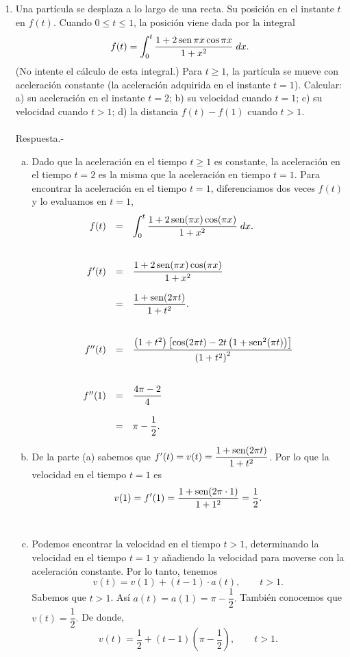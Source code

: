 \begin{enumerate}[\bfseries 1.]
    \item Una partícula se desplaza a lo largo de una recta. Su posición en el instante $t$ en $f(t)$. Cuando $0\leq t \leq 1$, la posición viene dada por la integral
    $$f(t)=\int_0^t \dfrac{1+2\mathop{\mbox{\normalfont sen}}\nolimits \pi x \cos \pi x}{1+x^2}\; dx.$$
    (No intente el cálculo de esta integral.) Para $t\geq 1$, la partícula se mueve con aceleración constante (la aceleración adquirida en el instante $t=1$). Calcular: a) su aceleración en el instante $t=2$; b) su velocidad cuando $t=1$; c) su velocidad cuando $t>1$; d) la distancia $f(t)-f(1)$ cuando $t>1$.\\\\
    	Respuesta.-\;
	\begin{enumerate}[a)]
	    \item Dado que la aceleración en el tiempo $t\geq 1$ es constante, la aceleración en el tiempo $t=2$ es la misma que la aceleración en tiempo $t=1$. Para encontrar la aceleración en el tiempo $t=1$, diferenciamos dos veces $f(t)$ y lo evaluamos en $t=1$,
	    $$\begin{array}{rcl}
		f(t)&=&\displaystyle\int_0^t \dfrac{1+2\mathop{\mbox{\normalfont sen}}\nolimits(\pi x)\cos (\pi x)}{1+x^2}\; dx.\\\\
		&&\\
		f'(t) &=& \dfrac{1+2\mathop{\mbox{\normalfont sen}}\nolimits(\pi x)\cos (\pi x)}{1+x^2}\\\\
		      &=& \dfrac{1+\mathop{\mbox{\normalfont sen}}\nolimits(2\pi t)}{1+t^2}.\\\\
		&&\\
		f''(t) &=& \dfrac{\left(1+t^2\right)\left[\cos(2\pi t)-2t\left(1+\mathop{\mbox{\normalfont sen}}\nolimits^2(\pi t)\right)\right]}{\left(1+t^2\right)^2}\\\\
		       &&\\
		       f''(1)&=& \dfrac{4\pi-2}{4}\\\\
			     &=&\pi-\dfrac{1}{2}.
	    \end{array}$$
	    \vspace{.5cm}

	    \item De la parte (a) sabemos que $f'(t)=v(t)=\dfrac{1+\mathop{\mbox{\normalfont sen}}\nolimits(2\pi t)}{1+t^2}$. Por lo que la velocidad en el tiempo $t=1$ es
		$$v(1)=f'(1)=\dfrac{1+\mathop{\mbox{\normalfont sen}}\nolimits(2\pi \cdot 1)}{1+1^2}=\dfrac{1}{2}.$$\\

	    \item Podemos encontrar la velocidad en el tiempo $t>1$, determinando la velocidad en el tiempo $t=1$ y añadiendo la velocidad para moverse con la aceleración constante. Por lo tanto, tenemos
	    $$v(t)=v(1)+(t-1)\cdot a(t),\qquad t>1.$$
	    Sabemos que $t>1$. Así $a(t)=a(1)=\pi-\dfrac{1}{2}.$ También conocemos que $v(t)=\dfrac{1}{2}.$ De donde,
	    $$v(t)=\dfrac{1}{2}+(t-1)\left(\pi-\dfrac{1}{2}\right),\qquad t>1.$$\\


\end{enumerate}
\end{enumerate}
